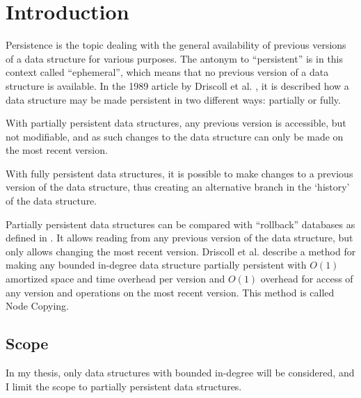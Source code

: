 \chapter{Introduction}
Persistence is the topic dealing with the general availability of previous
versions of a data structure for various purposes. The antonym to ``persistent''
is in this context called ``ephemeral'', which means that no previous version of
a data structure is available. In the 1989 article by Driscoll et al.
\cite{Driscoll198986}, it is described how a data structure may be made
persistent in two different ways: partially or fully.

With partially persistent data structures, any previous version is accessible,
but not modifiable, and as such changes to the data structure can only be made
on the most recent version.

With fully persistent data structures, it is possible to make changes to a
previous version of the data structure, thus creating an alternative branch in
the `history' of the data structure.

Partially persistent data structures can be compared with ``rollback'' databases
as defined in \cite{10.1109/AFIPS.1987.11}. It allows reading from any previous
version of the data structure, but only allows changing the most recent version.
Driscoll et al. describe a method for making any bounded in-degree data
structure partially persistent with $O(1)$ amortized space and time overhead per
version and $O(1)$ overhead for access of any version and operations on the most
recent version. This method is called Node Copying.

\section{Scope}

In my thesis, only data structures with bounded in-degree will be considered,
and I limit the scope to partially persistent data structures.
